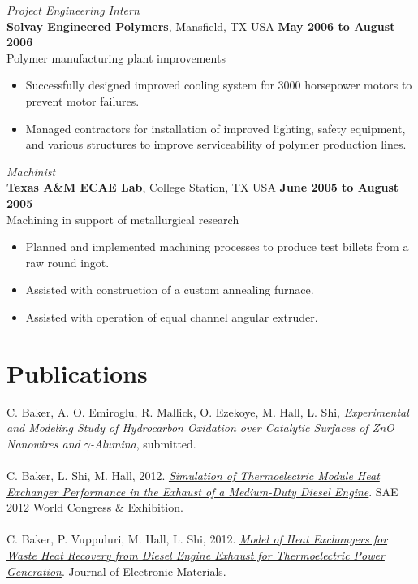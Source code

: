 \documentclass[centered]{res}
\begin{document}
\begin{resume}
%
\textit{Project Engineering Intern} \\
\href{http://www.lyondellbasell.com/LandingPages/SolvayEngineeredPolymers}{\textbf{Solvay
    Engineered Polymers}}, Mansfield, TX USA 
\hfill \textbf{May 2006 to August 2006} \\
Polymer manufacturing plant improvements 
\begin{itemize} \itemsep -2pt %
\item Successfully designed improved cooling system for 3000
  horsepower motors to prevent motor failures.
\item Managed contractors for installation of improved lighting,
  safety equipment, and various structures to improve serviceability
  of polymer production lines.
\end{itemize} 
%
\textit{Machinist} \\
\textbf{Texas A\&M ECAE Lab}, College Station, TX USA
\hfill \textbf{June 2005 to August 2005} \\
Machining in support of metallurgical research 
\begin{itemize} \itemsep -2pt %
\item Planned and implemented machining processes to produce test
  billets from a raw round ingot.
\item Assisted with construction of a custom annealing furnace.
\item Assisted with operation of equal channel angular extruder.
\end{itemize}   

\section{Publications}

C. Baker, A. O. Emiroglu, R. Mallick, O. Ezekoye, M. Hall, L. Shi,
\textit{Experimental and Modeling Study of Hydrocarbon Oxidation over
  Catalytic Surfaces of ZnO Nanowires and $\gamma$-Alumina}, submitted. \\
\vspace{-5pt} \\
%
C. Baker, L. Shi, M. Hall, 2012.
\href{http://papers.sae.org/2012-01-0411}{\textit{Simulation of
    Thermoelectric Module Heat Exchanger Performance in the Exhaust of
    a Medium-Duty Diesel Engine}}.  SAE 2012 World Congress \&
Exhibition.
\\
\vspace{-5pt} \\
%
C. Baker, P. Vuppuluri, M. Hall, L. Shi,
2012. \href{http://www.springerlink.com/content/x1328318r9523j00/}{\textit{Model
    of Heat Exchangers for Waste Heat Recovery from Diesel Engine
    Exhaust for Thermoelectric Power Generation}}. Journal of
Electronic Materials.


\end{resume}
\end{document}
